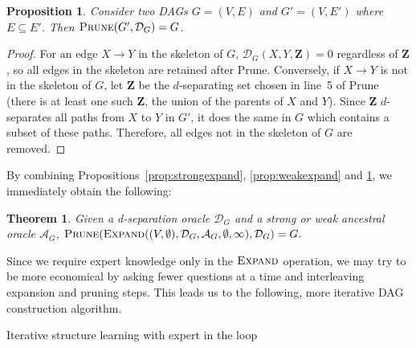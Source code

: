 \documentclass{uai2025} %
\newtheorem{proposition}{Proposition}
\newtheorem{theorem}{Theorem}
\begin{document}
\begin{proposition}
Consider two DAGs $G=(V,E)$ and $G'=(V,E')$ where $E \subseteq E'$. 
Then $\textsc{Prune}(G',\mathcal{D}_G)=G$.
\label{prop:prune}
\end{proposition}

\begin{proof}
For an edge $X \to Y$ in the skeleton of $G$, 
$\mathcal{D}_G(X, Y, \mathbf{Z}) = 0$ regardless 
of $\mathbf{Z}$, so all edges in the skeleton are 
retained after {\sc Prune}. Conversely, if 
 $X \to Y$ is not in the skeleton of $G$, let 
$\mathbf{Z}$ be the $d$-separating set chosen 
in line~5 of {\sc Prune} (there is at least one 
such $\mathbf{Z}$, the union of the parents of 
$X$ and $Y$). Since  $\mathbf{Z}$ $d$-separates 
all paths from $X$ to $Y$ in $G'$, it does the same 
in $G$ which contains a subset of these paths. 
Therefore, all edges not in the skeleton of $G$ are 
removed.
\end{proof}

By combining Propositions~\ref{prop:strongexpand}, \ref{prop:weakexpand} and 
\ref{prop:prune}, we immediately obtain the following:

\begin{theorem}
Given a d-separation oracle $\mathcal{D}_G$ and a strong or weak 
ancestral oracle $\mathcal{A}_G$, 
$\textsc{Prune}(\textsc{Expand}((V,\emptyset),\mathcal{D}_G,\mathcal{A}_G,\emptyset,\infty),\mathcal{D}_G)=G.$
\end{theorem}

Since we require expert knowledge only in the $\textsc{Expand}$ 
operation, we may try to be more economical by asking fewer 
questions at a time and interleaving expansion and
pruning steps. This leads us to the following, more iterative 
DAG construction algorithm.

\begin{algorithm}[h]
\DontPrintSemicolon
\SetAlgoLined
{}


\caption{Iterative structure learning with expert in the loop}
\label{algo:expert}
\end{algorithm} 
\end{document}
